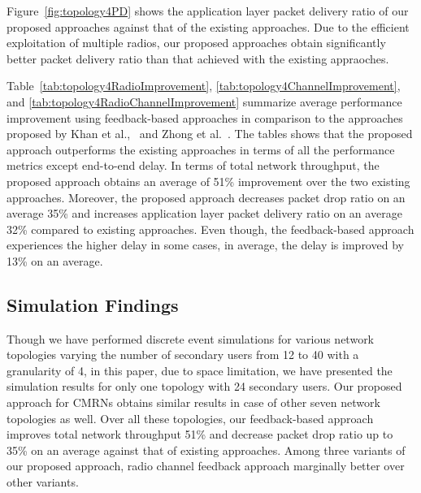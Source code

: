 \documentclass[letterpaper,conference]{IEEEtran}
\begin{document}
Figure~\ref{fig:topology4PD} shows the application layer packet delivery ratio of our proposed approaches against that of the existing approaches. Due to the efficient exploitation of multiple radios, our proposed approaches obtain significantly better packet delivery ratio than that achieved with the existing appraoches.

Table~\ref{tab:topology4RadioImprovement}, \ref{tab:topology4ChannelImprovement}, and \ref{tab:topology4RadioChannelImprovement} summarize average performance improvement using feedback-based approaches in comparison to the approaches proposed by Khan et al.,~\cite{khan2015towards} and Zhong et al.~\cite{zhong2014capacity}. The tables shows that the proposed approach outperforms the existing approaches in terms of all the performance metrics except end-to-end delay. In terms of total network throughput, the proposed approach obtains an average of 51\% improvement over the two existing approaches. Moreover, the proposed approach decreases packet drop ratio on an average 35\% and increases application layer packet delivery ratio on an average 32\% compared to existing approaches. Even though, the feedback-based approach experiences the higher delay in some cases, in average, the delay is improved by 13\% on an average.

%



\subsection{Simulation Findings}

Though we have performed discrete event simulations for various network topologies varying the number of secondary users from 12 to 40 with a granularity of 4, in this paper, due to space limitation, we have presented the simulation results for only one topology with 24 secondary users. Our proposed approach for CMRNs obtains similar results in case of other seven network topologies as well. Over all these topologies, our feedback-based approach improves total network throughput 51\% and decrease packet drop ratio up to 35\% on an average against that of existing approaches. Among three variants of our proposed approach, radio channel feedback approach marginally better over other variants.

\end{document}
